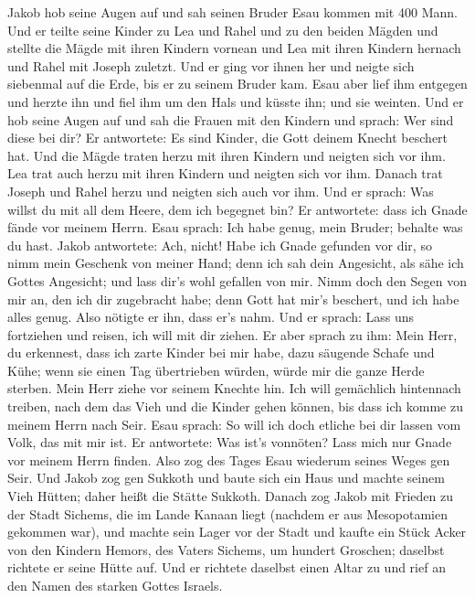  Jakob hob seine Augen auf und sah seinen Bruder Esau
kommen mit 400 Mann. Und er teilte seine Kinder zu Lea und Rahel und zu
den beiden Mägden  und stellte die Mägde mit ihren Kindern
vornean und Lea mit ihren Kindern hernach und Rahel mit Joseph zuletzt.
 Und er ging vor ihnen her und neigte sich siebenmal auf
die Erde, bis er zu seinem Bruder kam.  Esau aber lief ihm
entgegen und herzte ihn und fiel ihm um den Hals und küsste ihn; und sie
weinten.  Und er hob seine Augen auf und sah die Frauen
mit den Kindern und sprach: Wer sind diese bei dir? Er antwortete: Es
sind Kinder, die Gott deinem Knecht beschert hat.  Und die
Mägde traten herzu mit ihren Kindern und neigten sich vor ihm.
 Lea trat auch herzu mit ihren Kindern und neigten sich
vor ihm. Danach trat Joseph und Rahel herzu und neigten sich auch vor
ihm.  Und er sprach: Was willst du mit all dem Heere, dem
ich begegnet bin? Er antwortete: dass ich Gnade fände vor meinem Herrn.
 Esau sprach: Ich habe genug, mein Bruder; behalte was du
hast.  Jakob antwortete: Ach, nicht! Habe ich Gnade
gefunden vor dir, so nimm mein Geschenk von meiner Hand; denn ich sah
dein Angesicht, als sähe ich Gottes Angesicht; und lass dir's wohl
gefallen von mir.  Nimm doch den Segen von mir an, den
ich dir zugebracht habe; denn Gott hat mir's beschert, und ich habe
alles genug. Also nötigte er ihn, dass er's nahm.  Und er
sprach: Lass uns fortziehen und reisen, ich will mit dir ziehen.
 Er aber sprach zu ihm: Mein Herr, du erkennest, dass ich
zarte Kinder bei mir habe, dazu säugende Schafe und Kühe; wenn sie einen
Tag übertrieben würden, würde mir die ganze Herde sterben.
 Mein Herr ziehe vor seinem Knechte hin. Ich will
gemächlich hintennach treiben, nach dem das Vieh und die Kinder gehen
können, bis dass ich komme zu meinem Herrn nach Seir. 
Esau sprach: So will ich doch etliche bei dir lassen vom Volk, das mit
mir ist. Er antwortete: Was ist's vonnöten? Lass mich nur Gnade vor
meinem Herrn finden.  Also zog des Tages Esau wiederum
seines Weges gen Seir.  Und Jakob zog gen Sukkoth und
baute sich ein Haus und machte seinem Vieh Hütten; daher heißt die
Stätte Sukkoth.  Danach zog Jakob mit Frieden zu der
Stadt Sichems, die im Lande Kanaan liegt (nachdem er aus Mesopotamien
gekommen war), und machte sein Lager vor der Stadt  und
kaufte ein Stück Acker von den Kindern Hemors, des Vaters Sichems, um
hundert Groschen; daselbst richtete er seine Hütte auf. 
Und er richtete daselbst einen Altar zu und rief an den Namen des
starken Gottes Israels.

